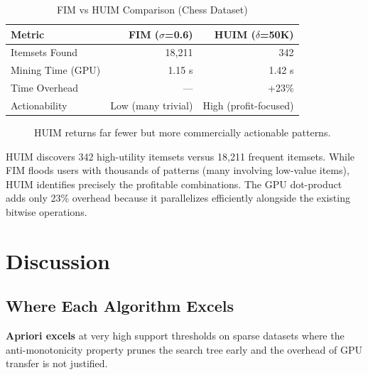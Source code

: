 \documentclass[conference]{IEEEtran}
\begin{document}
\begin{table}[htbp]
\caption{FIM vs HUIM Comparison (Chess Dataset)}
\centering
\begin{tabular}{@{}lrr@{}}
\toprule
\textbf{Metric} & \textbf{FIM ($\sigma$=0.6)} & \textbf{HUIM ($\delta$=50K)} \\ \midrule
Itemsets Found & 18,211 & 342 \\
Mining Time (GPU) & 1.15 s & 1.42 s \\
Time Overhead & --- & +23\% \\
Actionability & Low (many trivial) & High (profit-focused) \\
\bottomrule
\end{tabular}
\label{tab:huim}
\end{table}

\begin{figure}[htbp]
    \centering
    \caption{HUIM returns far fewer but more commercially actionable patterns.}
    \label{fig:huim}
\end{figure}

HUIM discovers 342 high-utility itemsets versus 18,211 frequent itemsets. While FIM floods users with thousands of patterns (many involving low-value items), HUIM identifies precisely the profitable combinations. The GPU dot-product adds only 23\% overhead because it parallelizes efficiently alongside the existing bitwise operations.

\section{Discussion}

\subsection{Where Each Algorithm Excels}
\textbf{Apriori excels} at very high support thresholds on sparse datasets where the anti-monotonicity property prunes the search tree early and the overhead of GPU transfer is not justified.
\end{document}
